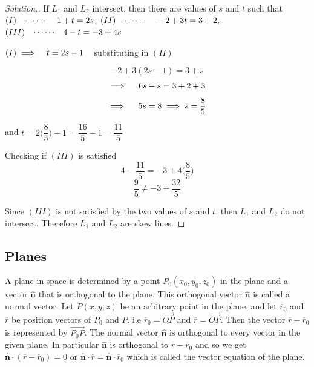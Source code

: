 \documentclass[11pt,a4paper]{article}
\theoremstyle{definition}
\newenvironment{solution}
  {\renewcommand{\qedsymbol}{}\begin{proof}[\textit{Solution}.]}
  {\end{proof}}
\begin{document}
\begin{solution}
If $L_1$ and $L_2$ intersect, then there are values of $s$ and $t$ such that
$(I)\hspace{0.3cm} \cdots\cdots\hspace{0.4cm} 1 + t = 2s$,
$(II)\hspace{0.3cm} \cdots\cdots\hspace{0.4cm} -2 + 3t = 3 + 2,$
$(III) \hspace{0.3cm} \cdots\cdots \hspace{0.3cm} 4 -t = -3 + 4s$

$(I) \implies \hspace{0.3cm} t = 2s - 1 \hspace{0.3cm}$ substituting in $(II)$

$$ - 2 + 3(2s - 1) = 3 + s$$
$$\implies\hspace{0.4cm} 6s - s = 3 + 2 + 3$$
$$\implies \hspace{0.4cm} 5s = 8 \implies s = \frac{8}{5}$$

and $t = 2\Big(\dfrac{8}{5}\Big) - 1 = \dfrac{16}{5} - 1 = \dfrac{11}{5}$

Checking if $(III)$ is satisfied
$$4 - \frac{11}{5} = -3 + 4\Big(\dfrac{8}{5}\Big)$$
$$\frac{9}{5}\neq - 3 + \frac{32}{5}$$ 

Since $(III)$ is not satisfied by the two values of $s$ and $t$, then $L_1$ and $L_2$ do not intersect. Therefore $L_1$ and $L_2$ are skew lines.
\end{solution}

\subsection{Planes}
A plane in space is determined by a point $P_0(x_0,y_0,z_0)$ in the plane and a vector $\widehat{\textbf{n}}$ that is orthogonal to the plane. This orthogonal vector $\widehat{\textbf{n}}$ is called a normal vector. Let $P(x,y,z)$ be an arbitrary point in the plane, and let $\overline{r}_0$ and $\overline{r}$ be position vectors of $P_0$ and $P$. i.e $\overline{r}_0 = \overrightarrow{OP}$ and $\overline{r} = \overrightarrow{OP}$. Then the vector $\overline{r} - \overline{r}_0$ is represented by $\overrightarrow{P_0P}$. The normal vector $\hat{\textbf{n}}$ is orthogonal to every vector in the given plane. In particular $\widehat{\textbf{n}}$ is orthogonal to $\overline{r} - \overline{r}_0$ and so we get $\widehat{\textbf{n}}\cdot (\overline{r} - \overline{r}_0) = 0$ or  $\widehat{\textbf{n}}\cdot \overline{r} = \widehat{\textbf{n}} \cdot \overline{r}_0$ which is called the vector equation of the plane.
\end{document}
